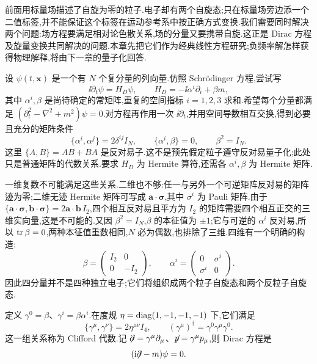 \label{ch:dirac-classical}

前面用标量场描述了自旋为零的粒子.电子却有两个自旋态;只在标量场旁边添一个二值标签,并不能保证这个标签在运动参考系中按正确方式变换.我们需要同时解决两个问题:场方程要满足相对论色散关系,场的分量又要携带自旋.这正是 Dirac 方程及旋量变换共同解决的问题.本章先把它们作为经典线性方程研究;负频率解怎样获得物理解释,将由下一章的量子化回答.


设 $\psi(t,\mathbf x)$ 是一个有 $N$ 个复分量的列向量.仿照 Schrödinger 方程,尝试写
\begin{equation}
 \ii\partial_t\psi=H_D\psi,
 \qquad H_D=-\ii\alpha^i\partial_i+\beta m,
 \label{eq:dirac-hamiltonian}
\end{equation}
其中 $\alpha^i,\beta$ 是尚待确定的常矩阵,重复的空间指标 $i=1,2,3$ 求和.希望每个分量都满足 $(\partial_t^2-\nabla^2+m^2)\psi=0$.对方程再作用一次 $\ii\partial_t$,并用空间导数相互交换,得到必要且充分的矩阵条件
\begin{equation}
 \{\alpha^i,\alpha^j\}=2\delta^{ij}I_N,
 \qquad \{\alpha^i,\beta\}=0,\qquad \beta^2=I_N.
\end{equation}
这里 $\{A,B\}=AB+BA$ 是反对易子.这不是预先假定粒子遵守反对易量子化;此处只是普通矩阵的代数关系.要求 $H_D$ 为 Hermite 算符,还需各 $\alpha^i,\beta$ 为 Hermite 矩阵.

一维复数不可能满足这些关系.二维也不够:任一与另外一个可逆矩阵反对易的矩阵迹为零;二维无迹 Hermite 矩阵可写成 $\mathbf a\cdot\boldsymbol\sigma$,其中 $\sigma^i$ 为 Pauli 矩阵.由于 $\{\mathbf a\cdot\boldsymbol\sigma,\mathbf b\cdot\boldsymbol\sigma\}=2\mathbf a\cdot\mathbf b\,I_2$,四个相互反对易且平方为 $I_2$ 的矩阵需要四个相互正交的三维实向量,这是不可能的.又因 $\beta^2=I_N$,$\beta$ 的本征值为 $\pm1$;它与可逆的 $\alpha^i$ 反对易,所以 $\tr\beta=0$,两种本征值重数相同,$N$ 必为偶数,也排除了三维.四维有一个明确的构造:
\begin{equation}
 \beta=\begin{pmatrix}I_2&0\\0&-I_2\end{pmatrix},
 \qquad
 \alpha^i=\begin{pmatrix}0&\sigma^i\\\sigma^i&0\end{pmatrix}.
\end{equation}
因此四分量并不是四种独立电子;它们将组织成两个粒子自旋态和两个反粒子自旋态.

\begin{definition}
定义 $\gamma^0=\beta$、$\gamma^i=\beta\alpha^i$.在度规 $\eta=\diag(1,-1,-1,-1)$ 下,它们满足
\begin{equation}
 \{\gamma^\mu,\gamma^\nu\}=2\eta^{\mu\nu}I_4,
 \qquad (\gamma^\mu)^\dagger=\gamma^0\gamma^\mu\gamma^0.
 \label{eq:clifford}
\end{equation}
这一组关系称为 Clifford 代数.记 $\slashed{\partial}=\gamma^\mu\partial_\mu$、$\slashed p=\gamma^\mu p_\mu$,则 Dirac 方程是
\begin{equation}
 (\ii\slashed{\partial}-m)\psi=0.
 \label{eq:dirac-equation}
\end{equation}
\end{definition}

